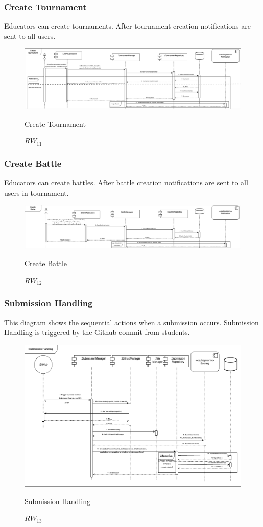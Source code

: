 \subsubsection{Create Tournament}
Educators can create tournaments. After tournament creation notifications are sent to all users.
\begin{figure}[H]
    \centering
    \includegraphics[width=\linewidth]{Images/runtime/create_tournament_runtime.drawio.png}
    \caption{$RW_{11}$} Create Tournament
\end{figure}

\subsubsection{Create Battle}
Educators can create battles. After battle creation notifications are sent to all users in tournament.
\begin{figure}[H]
    \centering
    \includegraphics[width=\linewidth]{Images/runtime/create_battle_runtime.drawio.png}
    \caption{$RW_{12}$} Create Battle
\end{figure}

\subsubsection{Submission Handling}
This diagram shows the sequential actions when a submission occurs. Submission Handling is triggered by the Github commit from students.
\begin{figure}[H]
    \centering
    \includegraphics[width=\linewidth]{Images/runtime/submission_handling_runtime.drawio.png}
    \caption{$RW_{13}$} Submission Handling
\end{figure}



